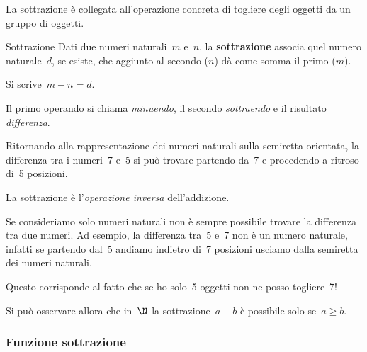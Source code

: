 La sottrazione è collegata all'operazione concreta di togliere degli 
oggetti da un gruppo di oggetti.

\begin{definizione}{Sottrazione}{}
Dati due numeri naturali~\(m\) e~\(n\), la \textbf{sottrazione} associa 
quel numero naturale~\(d\), se esiste, che aggiunto al secondo (\(n\)) 
dà come somma il primo (\(m\)).

Si scrive~\(m - n = d\).

Il primo operando si chiama \emph{minuendo}, il secondo \emph{sottraendo} e 
il risultato \emph{differenza}.
\end{definizione}

% 
Ritornando alla rappresentazione dei numeri naturali sulla semiretta 
orientata, la differenza tra i numeri~7 e~5 si può trovare partendo da~7 e 
procedendo a ritroso di~5 posizioni.

\noindent {}

La sottrazione è l'\emph{operazione inversa} dell'addizione.

Se consideriamo solo numeri naturali non è sempre possibile 
trovare la differenza tra due numeri.
Ad esempio, la differenza tra~5 e~7 non è un numero naturale, infatti se 
partendo dal~5 andiamo indietro di~7 posizioni 
usciamo dalla semiretta dei numeri naturali.
{\natsublineb}

Questo corrisponde al fatto che se ho solo~5 oggetti non ne posso 
togliere~7!

Si può osservare allora che in~\(\N\) la sottrazione~\(a - b\) è possibile 
solo se~\(a \geqslant b\).

\subsubsection{Funzione sottrazione}

